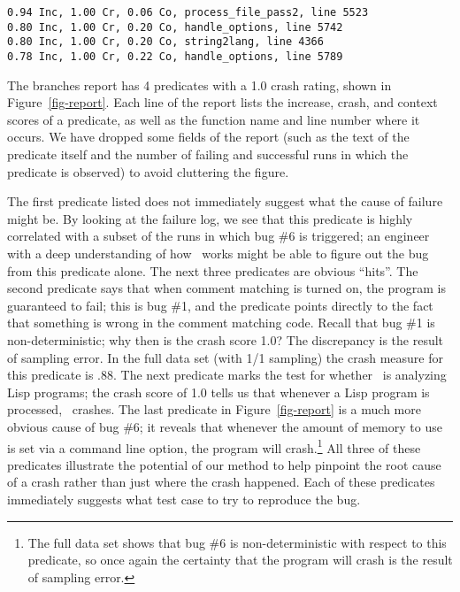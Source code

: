 \begin{figure*}
\centering
\begin{BVerbatim}
0.94 Inc, 1.00 Cr, 0.06 Co, process_file_pass2, line 5523
0.80 Inc, 1.00 Cr, 0.20 Co, handle_options, line 5742
0.80 Inc, 1.00 Cr, 0.20 Co, string2lang, line 4366
0.78 Inc, 1.00 Cr, 0.22 Co, handle_options, line 5789
\end{BVerbatim}

\caption{The top four entries from the branches report.}
\label{fig-report}
\end{figure*}

The branches report has 4 predicates with a 1.0 crash rating, shown
in Figure~\ref{fig-report}.  Each line of the report lists the
increase, crash, and context scores of a predicate, as well as the 
function name and line number where it occurs.  We have dropped some fields of the report (such as the text of the predicate itself and the number of failing and successful runs in which the predicate is observed) to avoid cluttering the
figure.

The first predicate listed does not immediately suggest what the cause
of failure might be. By looking at the failure log, we see that this predicate
is highly correlated with a subset of the runs in which bug \#6 is
triggered; an engineer with a deep understanding of how \moss\ works
might be able to figure out the bug from this predicate alone.
The next three predicates are obvious ``hits''. The second predicate
says that when comment matching is turned on, the program is
guaranteed to fail; this is bug \#1, and the predicate points directly
to the fact that something is wrong in the comment matching code.
Recall that bug \#1 is non-deterministic; why then is the crash score 1.0?
The discrepancy is the result of sampling error.  In the full data set
(with 1/1 sampling) the crash measure for this predicate is .88.  The
next predicate marks the test for whether \moss\ is analyzing Lisp
programs; the crash score of 1.0 tells us that whenever a Lisp program is
processed, \moss\ crashes.  The last predicate in
Figure~\ref{fig-report} is a much more obvious cause of 
bug \#6; it reveals that whenever the amount of memory to use is set
via a command line option, the program will crash.\footnote{The full data set shows that bug \#6 is non-deterministic with respect to this predicate, so once again the certainty that the program will crash is the result of sampling error.}  All three of these predicates illustrate the potential of our method to
help pinpoint the root cause of a crash rather than just where the crash
happened.  Each of these predicates immediately suggests
what test case to try to reproduce the bug. 

